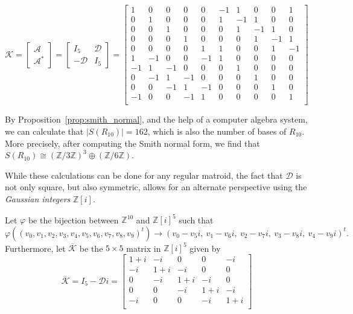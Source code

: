 \documentclass[12p]{amsart}
\numberwithin{equation}{section}
\theoremstyle{plain}
\theoremstyle{definition}
\newcommand{\Z}{\mathbb {Z}}
\begin{document}
\[\mathcal K = \begin{bmatrix} \mathcal A\\ \mathcal A^* \end{bmatrix} = \begin{bmatrix} I_5 & \mathcal D \\ -\mathcal D & I_5 \end{bmatrix}= \begin{bmatrix}
    1 & 0 & 0 & 0 & 0 &   -1 & 1 & 0 & 0 & 1\\
    0 & 1 & 0 & 0 & 0 &   1 & -1 & 1 & 0 & 0\\
    0 & 0 & 1 & 0 & 0 &   0 & 1 & -1 & 1 & 0\\
    0 & 0 & 0 & 1 & 0 &   0 & 0 & 1 & -1 & 1\\
    0 & 0 & 0 & 0 & 1 &   1 & 0 & 0 & 1 & -1\\
    1 & -1 & 0 & 0 & -1 &  1 & 0 & 0 & 0 & 0\\
    -1 & 1 & -1 & 0 & 0 &  0 & 1 & 0 & 0 & 0\\
    0 & -1 & 1 & -1 & 0 &  0 & 0 & 1 & 0 & 0\\
    0 & 0 & -1 & 1 & -1 &  0 & 0 & 0 & 1 & 0\\
    -1 & 0 & 0 & -1 & 1 &  0 & 0 & 0 & 0 & 1\\
\end{bmatrix}\]

By Proposition~\ref{prop:smith_normal}, and the help of a computer algebra system, we can calculate that $|S(R_{10})| = 162$, which is also the number of bases of $R_{10}$. More precisely, after computing the Smith normal form, we find that $S(R_{10}) \cong (\Z/3\Z)^3 \oplus (\Z/6\Z)$.

While these calculations can be done for any regular matroid, the fact that $\mathcal D$ is not only square, but also symmetric, allows for an alternate perspective using the \emph{Gaussian integers} $\Z[i]$.

Let $\varphi$ be the bijection between $\Z^{10}$ and $\Z[i]^5$ such that 
\[\varphi((v_0,v_1,v_2,v_3,v_4,v_5,v_6,v_7,v_8,v_9)^t) \to (v_0 - v_5i,~v_1 - v_6i,~v_2 - v_7i,~v_3 - v_8i,~v_4 - v_9i)^t.\]
Furthermore, let $\overline{\mathcal K}$ be the $5\times 5$ matrix in $\Z[i]^5$ given by 
\[\overline{\mathcal K} =  I_5 - \mathcal D i =\begin{bmatrix}
    1 + i & -i & 0 & 0 & -i \\
    -i & 1 + i & -i & 0 & 0 \\
    0 & -i & 1 + i & -i & 0 \\
    0 & 0 & -i & 1 + i & -i \\
    -i & 0 & 0 & -i & 1 + i \\
\end{bmatrix}\]
\end{document}
